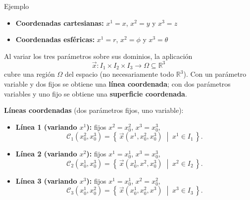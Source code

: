 \documentclass[../apunte_mecanica_clasica.tex]{subfiles}%
\begin{document}
\begin{apuntebloque}{Ejemplo}
\begin{itemize}
    \item \textbf{Coordenadas cartesianas:} $x^1=x$,  $x^2=y$ y $x^3=z$ 
    \item \textbf{Coordenadas esféricas:} $x^1=r$,  $x^2=\phi$ y $x^3=\theta$ 
\end{itemize}
\end{apuntebloque}

Al variar los tres parámetros sobre sus dominios, la aplicación
\begin{equation*}
\vec{x}: I_1 \times I_2 \times I_3 \longrightarrow \Omega \subseteq \mathbb{R}^3
\end{equation*}
cubre una región $\Omega$ del espacio (no necesariamente todo $\mathbb{R}^3$).
Con un parámetro variable y dos fijos se obtiene una \textbf{línea coordenada};
con dos parámetros variables y uno fijo se obtiene una \textbf{superficie coordenada}.

\textbf{Líneas coordenadas} (dos parámetros fijos, uno variable):
\begin{itemize}
    \item \textbf{Línea 1 (variando $x^1$):} fijos $x^2 = x^2_0$, $x^3 = x^3_0$,
    \begin{equation*}
        \mathcal{C}_1(x^2_0,x^3_0)
        = \left\{\, \vec{x}(x^1,x^2_0,x^3_0) \;\middle|\; x^1 \in I_1 \,\right\}.
    \end{equation*}

    \item \textbf{Línea 2 (variando $x^2$):} fijos $x^1 = x^1_0$, $x^3 = x^3_0$,
    \begin{equation*}
        \mathcal{C}_2(x^1_0,x^3_0)
        = \left\{\, \vec{x}(x^1_0,x^2,x^3_0) \;\middle|\; x^2 \in I_2 \,\right\}.
    \end{equation*}

    \item \textbf{Línea 3 (variando $x^3$):} fijos $x^1 = x^1_0$, $x^2 = x^2_0$,
    \begin{equation*}
        \mathcal{C}_3(x^1_0,x^2_0)
        = \left\{\, \vec{x}(x^1_0,x^2_0,x^3) \;\middle|\; x^3 \in I_3 \,\right\}.
    \end{equation*}
\end{itemize}
\end{document}

